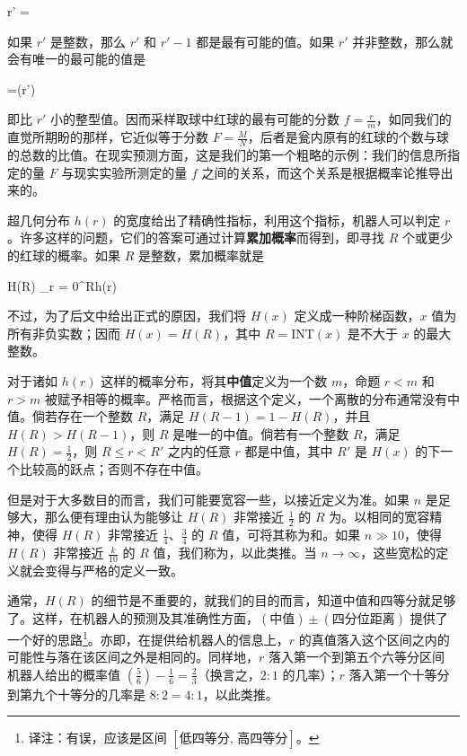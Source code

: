 \placeformula[3-26]
\startformula
r' = 
\stopformula

如果 $r'$ 是整数，那么 $r'$ 和 $r' - 1$ 都是最有可能的值。如果 $r'$ 并非整数，那么就会有唯一的最可能的值是

\placeformula[3-27]
\startformula
{}=(r')
\stopformula

即比 $r'$ 小的整型值。因而采样取球中红球的最有可能的分数 $f = \frac{r}{m}$，如同我们的直觉所期盼的那样，它近似等于分数 $F = \frac{M}{N}$，后者是瓮内原有的红球的个数与球的总数的比值。在现实预测方面，这是我们的第一个粗略的示例：我们的信息所指定的量 $F$ 与现实实验所测定的量 $f$ 之间的关系，而这个关系是根据概率论推导出来的。

超几何分布 $h(r)$ 的宽度给出了精确性指标，利用这个指标，机器人可以判定 $r$。许多这样的问题，它们的答案可通过计算{\bf 累加概率}而得到，即寻找 $R$ 个或更少的红球的概率。如果 $R$ 是整数，累加概率就是

\placeformula[3-28]
\startformula
H(R) \equiv\sum_{r = 0}^Rh(r)
\stopformula

不过，为了后文中给出正式的原因，我们将 $H(x)$ 定义成一种阶梯函数，$x$ 值为所有非负实数；因而 $H(x)=H(R)$，其中 $R = \text{INT}(x)$ 是不大于 $x$ 的最大整数。

对于诸如 $h(r)$ 这样的概率分布，将其{\bf 中值}定义为一个数 $m$，命题 $r < m$ 和 $r > m$ 被赋予相等的概率。严格而言，根据这个定义，一个离散的分布通常没有中值。倘若存在一个整数 $R$，满足 $H(R - 1) = 1 - H(R)$，并且 $H(R) > H(R - 1)$，则 $R$ 是唯一的中值。倘若有一个整数 $R$，满足 $H(R) = \frac{1}{2}$，则 $R\le r < R'$ 之内的任意 $r$ 都是中值，其中 $R'$ 是 $H(x)$ 的下一个比较高的跃点；否则不存在中值。

但是对于大多数目的而言，我们可能要宽容一些，以接近定义为准。如果 $n$ 是足够大，那么便有理由认为能够让 $H(R)$ 非常接近 $\frac{1}{2}$ 的 $R$ 为。以相同的宽容精神，使得 $H(R)$ 非常接近 $\frac{1}{4}$、$\frac{3}{4}$ 的 $R$ 值，可将其称为和。如果 $n \gg 10$，使得 $H(R)$ 非常接近 $\frac{k}{10}$ 的 $R$ 值，我们称为，以此类推。当 $n \rightarrow \infty$，这些宽松的定义就会变得与严格的定义一致。

通常，$H(R)$ 的细节是不重要的，就我们的目的而言，知道中值和四等分就足够了。这样，在机器人的预测及其准确性方面，$(\text{中值})\pm (\text{四分位距离})$ 提供了一个好的思路\footnote{译注：有误，应该是区间 $[\text{低四等分},\,\text{高四等分}]$。}。亦即，在提供给机器人的信息上，$r$ 的真值落入这个区间之内的可能性与落在该区间之外是相同的。同样地，$r$ 落入第一个到第五个六等分区间 机器人给出的概率值 $(\frac{5}{6}) - \frac{1}{6} = \frac{2}{3}$（换言之，$2:1$ 的几率）；$r$ 落入第一个十等分到第九个十等分的几率是 $8:2 = 4:1$，以此类推。

